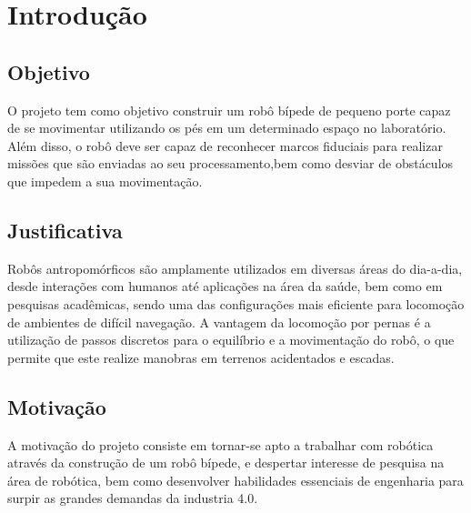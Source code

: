 \chapter{Introdução}
\label{chap:intro}

\section{Objetivo}

O projeto tem como objetivo construir um robô bípede de pequeno porte capaz de se movimentar utilizando os pés em um determinado espaço no laboratório. Além disso, o robô deve ser capaz de reconhecer marcos fiduciais para realizar missões que são enviadas ao seu processamento,bem como desviar de obstáculos que impedem a sua movimentação.

\section{Justificativa}

Robôs antropomórficos são amplamente utilizados em diversas áreas do dia-a-dia, desde interações com humanos até aplicações na área da saúde, bem como em pesquisas acadêmicas, sendo uma das configurações mais eficiente para locomoção de ambientes de difícil navegação.
A vantagem da locomoção por pernas é a utilização de passos discretos para o equilíbrio e a movimentação do robô, o que permite que este realize manobras em terrenos acidentados e escadas. 

\section{Motivação}

A motivação do projeto consiste em tornar-se apto a trabalhar com robótica através da construção de um robô bípede, e despertar interesse de pesquisa na área de robótica, bem como desenvolver habilidades essenciais de engenharia para surpir as grandes demandas da industria 4.0.
